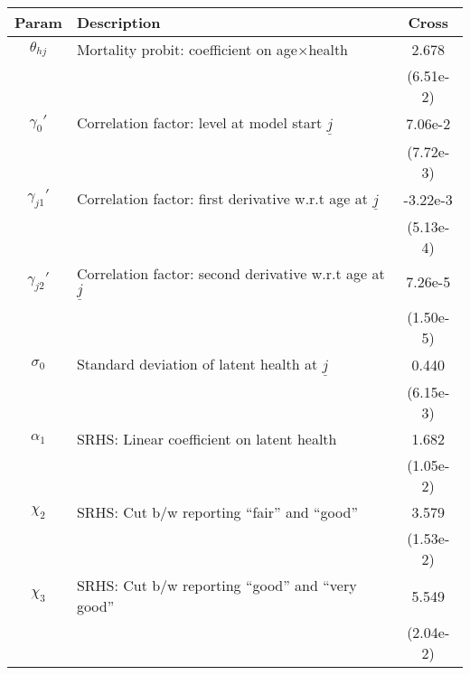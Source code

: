 \begin{table}[ht]\label{CrossMenOtherParams}
\footnotesize
\begin{center}
\begin{tabular}{clc}
\hline \hline
Param & Description & Cross \\
\hline
$\theta_{hj}$ & Mortality probit: coefficient on age$\times$health & 2.678 \\
 & & (6.51e-2) \\
$\gamma_{0}'$ & Correlation factor: level at model start $\underline{j}$ & 7.06e-2 \\
 & & (7.72e-3) \\
$\gamma_{j1}'$ & Correlation factor: first derivative w.r.t age at $\underline{j}$ & -3.22e-3 \\
 & & (5.13e-4) \\
$\gamma_{j2}'$ & Correlation factor: second derivative w.r.t age at $\underline{j}$ & 7.26e-5 \\
 & & (1.50e-5) \\
$\sigma_{0}$ & Standard deviation of latent health at $\underline{j}$ & 0.440 \\
 & & (6.15e-3) \\
$\alpha_1$ & SRHS: Linear coefficient on latent health & 1.682 \\
 & & (1.05e-2) \\
$\chi_2$ & SRHS: Cut b/w reporting ``fair'' and ``good'' & 3.579 \\
 & & (1.53e-2) \\
$\chi_3$ & SRHS: Cut b/w reporting ``good'' and ``very good'' & 5.549 \\
 & & (2.04e-2) \\
\hline\hline
\end{tabular}
\end{center}
\end{table}
